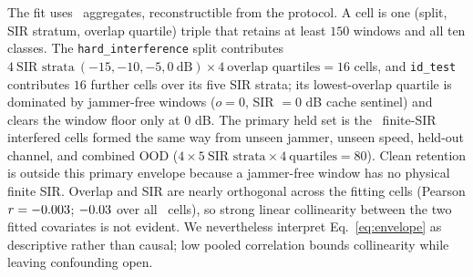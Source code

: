 \documentclass[letterpaper,journal]{IEEEtran}
\begin{document}
The fit uses \EnvelopeFitCells\ aggregates, reconstructible from the protocol.
A cell is one (split, SIR stratum,
overlap quartile) triple that retains at least $150$ windows and all ten
classes. The \texttt{hard\_interference} split contributes
$4\ \text{SIR strata}\ (-15,-10,-5,0\ \text{dB})\times4\ \text{overlap
quartiles}=16$ cells, and \texttt{id\_test} contributes $16$ further cells
over its five SIR strata; its lowest-overlap quartile is dominated by
jammer-free windows ($o=0$, SIR $=0$ dB cache sentinel) and clears the window
floor only at $0$ dB. The primary held set is the
\EnvelopeHoldoutCells\ finite-SIR interfered cells formed the same way from
unseen jammer, unseen speed, held-out channel, and combined OOD
($4\times5\ \text{SIR strata}\times4\ \text{quartiles}=80$). Clean retention is
outside this primary envelope because a jammer-free window has no
physical finite SIR.
Overlap and SIR are nearly orthogonal across the fitting cells
(Pearson $r=-0.003$; $-0.03$ over all
\EnvelopeCellCount\ cells), so strong linear collinearity between the two
fitted covariates is not evident. We nevertheless interpret
Eq.~\eqref{eq:envelope} as descriptive rather than causal; low pooled
correlation bounds collinearity while leaving confounding open.
\end{document}

